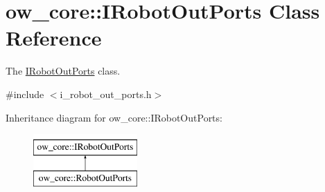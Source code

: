 \hypertarget{classow__core_1_1IRobotOutPorts}{}\section{ow\+\_\+core\+:\+:I\+Robot\+Out\+Ports Class Reference}
\label{classow__core_1_1IRobotOutPorts}


The \hyperlink{classow__core_1_1IRobotOutPorts}{I\+Robot\+Out\+Ports} class.  




{\ttfamily \#include $<$i\+\_\+robot\+\_\+out\+\_\+ports.\+h$>$}

Inheritance diagram for ow\+\_\+core\+:\+:I\+Robot\+Out\+Ports\+:\begin{figure}[H]
\begin{center}
\leavevmode
\includegraphics[height=2.000000cm]{d2/d40/classow__core_1_1IRobotOutPorts}
\end{center}
\end{figure}
